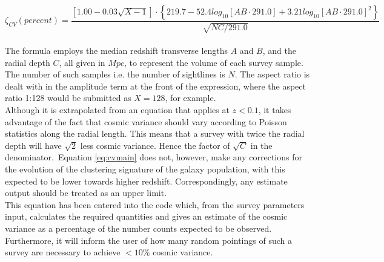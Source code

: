 \documentclass [a4paper, 12pt] {article}
\begin{document}
\begin {equation} \label{eq:cvmain}
\zeta _{CV}\left ( percent \right )=\frac{\left [ 1.00-0.03\sqrt{X-1} \right ]\cdot \left \{ 219.7-52.4log_{10}\left [ AB\cdot 291.0 \right ] + 3.21log_{10}\left [ AB\cdot291.0 \right ]^{2} \right \}}{\sqrt{NC/291.0}}
\end {equation}
\\
\newline
The formula employs the median redshift transverse lengths $A$ and $B$, and the radial depth $C$, all given in $Mpc$, to represent the volume of each survey sample. The number of such samples i.e. the number of sightlines is $N$. The aspect ratio is dealt with in the amplitude term at the front of the expression, where the aspect ratio 1:128 would be submitted as $X=128$, for example.
\\
\newline
Although it is extrapolated from an equation that applies at $z<0.1$, it takes advantage of the fact that cosmic variance should vary according to Poisson statistics along the radial length. This means that a survey with twice the radial depth will have $\sqrt{2}$ less cosmic variance. Hence the factor of $\sqrt{C}$ in the denominator.~Equation \ref {eq:cvmain} does not, however, make any corrections for the evolution of the clustering signature of the galaxy population, with this expected to be lower towards higher redshift. Correspondingly, any estimate output should be treated as an upper limit.
\\
\newline
This equation has been entered into the code which, from the survey parameters input, calculates the required quantities and gives an estimate of the cosmic variance as a percentage of the number counts expected to be observed. Furthermore, it will inform the user of how many random pointings of such a survey are necessary to achieve $<10\%$ cosmic variance.
\end{document}
